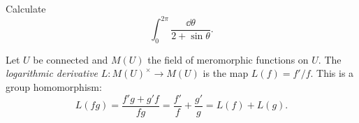 \begin{example}
	Calculate
	\[
		\int_{0}^{2\pi } \frac{\dd \theta }{2+\sin \theta }
	.\]
\end{example}

Let $U$ be connected and $M(U)$ the field of meromorphic functions on $U$. The \emph{logarithmic derivative} $L : M(U)^\times \to M(U)$ is the map $L(f) = f'/f$. This is a group homomorphism:
\[
	L(fg) = \frac{f'g+g'f}{fg} =\frac{f'}{f} +\frac{g'}{g} =L(f)+L(g)
.\]

